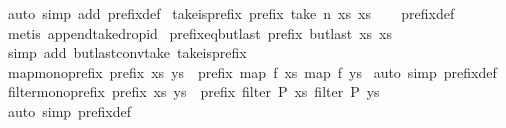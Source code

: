 \begin{isabellebody}
\ {\isacharparenleft}auto\ simp\ add{\isacharcolon}\ prefix{\isacharunderscore}def{\isacharparenright}%
\endisatagproof
{\isafoldproof}%
%
\isadelimproof
\isanewline
%
\endisadelimproof
\isanewline
{}\isamarkupfalse%
\ take{\isacharunderscore}is{\isacharunderscore}prefix{\isacharcolon}\ {\isachardoublequoteopen}prefix\ {\isacharparenleft}take\ n\ xs{\isacharparenright}\ xs{\isachardoublequoteclose}\isanewline
%
\isadelimproof
\ \ %
\endisadelimproof
%
\isatagproof
{}\isamarkupfalse%
\ prefix{\isacharunderscore}def\ \isamarkupfalse%
\ {\isacharparenleft}metis\ append{\isacharunderscore}take{\isacharunderscore}drop{\isacharunderscore}id{\isacharparenright}%
\endisatagproof
{\isafoldproof}%
%
\isadelimproof
\isanewline
%
\endisadelimproof
\isanewline
{}\isamarkupfalse%
\ prefixeq{\isacharunderscore}butlast{\isacharcolon}\ {\isachardoublequoteopen}prefix\ {\isacharparenleft}butlast\ xs{\isacharparenright}\ xs{\isachardoublequoteclose}\isanewline
%
\isadelimproof
%
\endisadelimproof
%
\isatagproof
{}\isamarkupfalse%
\ {\isacharparenleft}simp\ add{\isacharcolon}\ butlast{\isacharunderscore}conv{\isacharunderscore}take\ take{\isacharunderscore}is{\isacharunderscore}prefix{\isacharparenright}%
\endisatagproof
{\isafoldproof}%
%
\isadelimproof
\isanewline
%
\endisadelimproof
\isanewline
{}\isamarkupfalse%
\ map{\isacharunderscore}mono{\isacharunderscore}prefix{\isacharcolon}\ {\isachardoublequoteopen}prefix\ xs\ ys\ {\isasymLongrightarrow}\ prefix\ {\isacharparenleft}map\ f\ xs{\isacharparenright}\ {\isacharparenleft}map\ f\ ys{\isacharparenright}{\isachardoublequoteclose}\isanewline
%
\isadelimproof
%
\endisadelimproof
%
\isatagproof
{}\isamarkupfalse%
\ {\isacharparenleft}auto\ simp{\isacharcolon}\ prefix{\isacharunderscore}def{\isacharparenright}%
\endisatagproof
{\isafoldproof}%
%
\isadelimproof
\isanewline
%
\endisadelimproof
\isanewline
{}\isamarkupfalse%
\ filter{\isacharunderscore}mono{\isacharunderscore}prefix{\isacharcolon}\ {\isachardoublequoteopen}prefix\ xs\ ys\ {\isasymLongrightarrow}\ prefix\ {\isacharparenleft}filter\ P\ xs{\isacharparenright}\ {\isacharparenleft}filter\ P\ ys{\isacharparenright}{\isachardoublequoteclose}\isanewline
%
\isadelimproof
%
\endisadelimproof
%
\isatagproof
{}\isamarkupfalse%
\ {\isacharparenleft}auto\ simp{\isacharcolon}\ prefix{\isacharunderscore}def{\isacharparenright}%
\endisatagproof
{\isafoldproof}%
%
\isadelimproof
\isanewline
%
\endisadelimproof
\isanewline
{}\isamarkupfalse%

\end{isabellebody}

